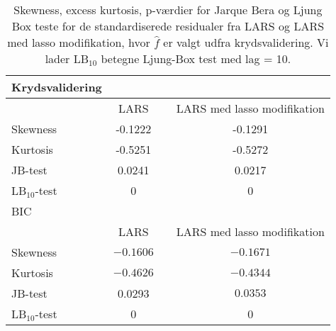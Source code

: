 \begin{table}
\center
\begin{tabular}{lccc} 
Krydsvalidering \\
\toprule
& LARS && LARS med lasso modifikation \\ \midrule
Skewness & -0.1222 && -0.1291   \\
Kurtosis & -0.5251  && -0.5272 \\
JB-test & 0.0241 &&  0.0217 \\
LB$_{10}$-test &0 && 0   \\  \bottomrule \toprule
BIC \\ \toprule
& LARS && LARS med lasso modifikation \\ \midrule
Skewness & $-0.1606$  && $-0.1671$    \\
Kurtosis &   $-0.4626$ && $-0.4344 $ \\
JB-test & 0.0293 &&  $0.0353$ \\
LB$_{10}$-test & 0 && 0  \\  \bottomrule 
\end{tabular}
\caption{Skewness, excess kurtosis, p-værdier for Jarque Bera og Ljung Box teste for de standardiserede residualer fra LARS og LARS med lasso modifikation, hvor  $\widehat{f}$ er valgt udfra krydsvalidering. Vi lader LB$_{10}$ betegne Ljung-Box test med lag = 10. } \label{tab:lars_kryds_res_tab}
\end{table}